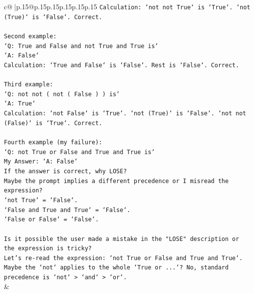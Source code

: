 \documentclass{article}
\begin{document}
{\begin{supertabular}{c@{$\;$}|p{.15\linewidth}@{}p{.15\linewidth}p{.15\linewidth}p{.15\linewidth}p{.15\linewidth}p{.15\linewidth}}
{{{\texttt{Calculation: `not not True` is `True`. `not (True)` is `False`. Correct.} \\
\\ 
\texttt{Second example:} \\
\texttt{`Q: True and False and not True and True is`} \\
\texttt{`A: False`} \\
\texttt{Calculation: `True and False` is `False`. Rest is `False`. Correct.} \\
\\ 
\texttt{Third example:} \\
\texttt{`Q: not not ( not ( False ) ) is`} \\
\texttt{`A: True`} \\
\texttt{Calculation: `not False` is `True`. `not (True)` is `False`. `not not (False)` is `True`. Correct.} \\
\\ 
\texttt{Fourth example (my failure):} \\
\texttt{`Q: not True or False and True and True is`} \\
\texttt{My Answer: `A: False`} \\
\texttt{If the answer is correct, why LOSE?} \\
\texttt{Maybe the prompt implies a different precedence or I misread the expression?} \\
\texttt{`not True` = `False`.} \\
\texttt{`False and True and True` = `False`.} \\
\texttt{`False or False` = `False`.} \\
\\ 
\texttt{Is it possible the user made a mistake in the "LOSE" description or the expression is tricky?} \\
\texttt{Let's re{-}read the expression: `not True or False and True and True`.} \\
\texttt{Maybe the `not` applies to the whole `True or ...`? No, standard precedence is `not` > `and` > `or`.} \\
            }
        }
    }
    & \\ \\

\end{supertabular}
}
\end{document}
